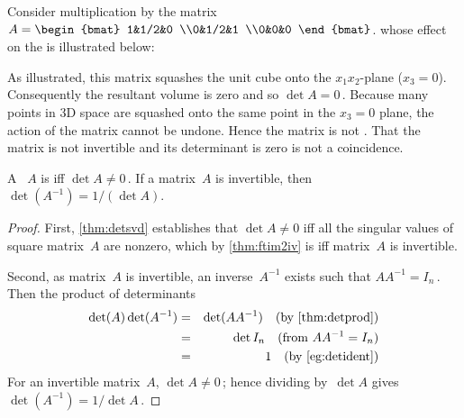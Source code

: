 \begin{example} \label{eg:detzerorow}
Consider multiplication by the matrix 
\(A=\begin{bmat} 1&1/2&0
\\0&1/2&1 \\0&0&0 \end{bmat}\).
whose effect on the  is illustrated below:
\begin{center}
\end{center}
As illustrated, this matrix squashes the unit cube onto the \(x_1x_2\)-plane (\(x_3=0\)).
Consequently the resultant volume is zero and so \(\det A=0\)\,.
Because many points in 3D space are squashed onto the same point in the \(x_3=0\) plane, the action of the matrix cannot be undone.  
Hence the matrix is not . 
That the matrix is not invertible and its determinant is zero is not a coincidence.
\end{example}


\begin{theorem} \label{thm:detinv} 
A ~\(A\) is  iff \(\det A\neq 0\)\,.
If a matrix~\(A\) is invertible, then \(\det(A^{-1})=1/(\det A)\).
\end{theorem}
\begin{proof} 
First, \autoref{thm:detsvd} establishes that \(\det A\neq 0\) iff all the singular values of square matrix~\(A\) are nonzero, which by \autoref{thm:ftim2iv} is iff matrix~\(A\) is invertible.

Second, as matrix~\(A\) is invertible, an inverse~\(A^{-1}\) exists such that \(AA^{-1}=I_n\)\,.
Then the product of determinants
\begin{eqnarray*}
\det(A)\det(A^{-1})
&=&\det(AA^{-1}) \quad(\text{by \autoref{thm:detprod}})
\\&=&\det I_n\quad(\text{from }AA^{-1}=I_n)
\\&=&1\quad(\text{by \autoref{eg:detident}})
\end{eqnarray*}
For an invertible matrix~\(A\), \(\det A\neq 0\)\,; hence
dividing by~\(\det A\) gives \(\det(A^{-1})=1/\det A\)\,.
\end{proof}






\sectionExercises



